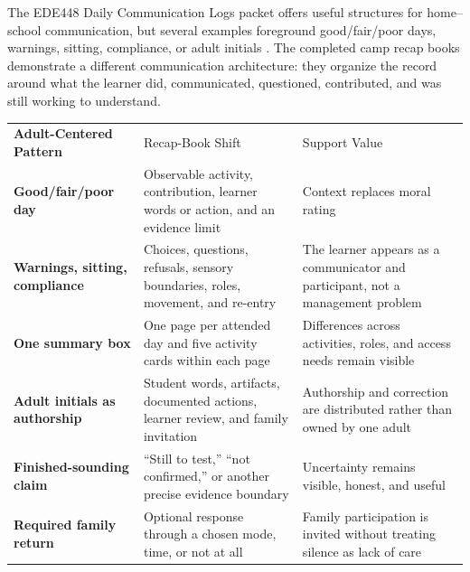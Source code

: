 The EDE448 Daily Communication Logs packet offers useful structures for home--school communication, but several examples foreground good/fair/poor days, warnings, sitting, compliance, or adult initials \citep{dailylogs2009}. The completed camp recap books demonstrate a different communication architecture: they organize the record around what the learner did, communicated, questioned, contributed, and was still working to understand.

\renewcommand{\arraystretch}{1.00}
\setlength{\tabcolsep}{3pt}

\begin{tabularx}{\textwidth}{
>{\bfseries\RaggedRight\arraybackslash}p{1.19in}
>{\RaggedRight\arraybackslash}p{2.70in}
>{\RaggedRight\arraybackslash}X}

\rowcolor{MidTeal}
\color{white}Adult-Centered Pattern &
\color{white}Recap-Book Shift &
\color{white}Support Value \\

Good/fair/poor day &
Observable activity, contribution, learner words or action, and an evidence limit &
Context replaces moral rating \\

\rowcolor{SoftGray}
Warnings, sitting, compliance &
Choices, questions, refusals, sensory boundaries, roles, movement, and re-entry &
The learner appears as a communicator and participant, not a management problem \\

One summary box &
One page per attended day and five activity cards within each page &
Differences across activities, roles, and access needs remain visible \\

\rowcolor{SoftGray}
Adult initials as authorship &
Student words, artifacts, documented actions, learner review, and family invitation &
Authorship and correction are distributed rather than owned by one adult \\

Finished-sounding claim &
``Still to test,'' ``not confirmed,'' or another precise evidence boundary &
Uncertainty remains visible, honest, and useful \\

\rowcolor{SoftGray}
Required family return &
Optional response through a chosen mode, time, or not at all &
Family participation is invited without treating silence as lack of care \\

\end{tabularx}

